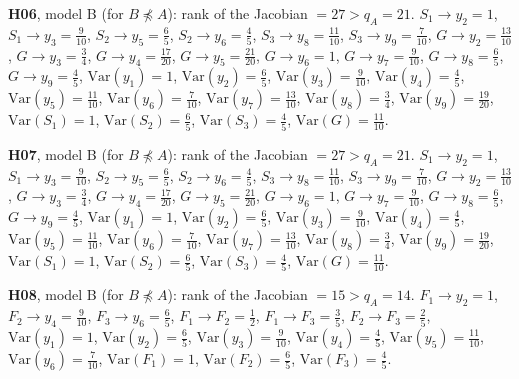 \documentclass[10pt,a4paper]{article}
\newcommand{\nnest}{\not\preceq}
\begin{document}
{\noindent\textbf{H06}, model B (for $B\nnest A$): rank of the Jacobian $=27>q_A=21$. {\footnotesize $S_{1}\to y_{2}=1$, $S_{1}\to y_{3}=\tfrac{9}{10}$, $S_{2}\to y_{5}=\tfrac{6}{5}$, $S_{2}\to y_{6}=\tfrac{4}{5}$, $S_{3}\to y_{8}=\tfrac{11}{10}$, $S_{3}\to y_{9}=\tfrac{7}{10}$, $G\to y_{2}=\tfrac{13}{10}$, $G\to y_{3}=\tfrac{3}{4}$, $G\to y_{4}=\tfrac{17}{20}$, $G\to y_{5}=\tfrac{21}{20}$, $G\to y_{6}=1$, $G\to y_{7}=\tfrac{9}{10}$, $G\to y_{8}=\tfrac{6}{5}$, $G\to y_{9}=\tfrac{4}{5}$, $\mathrm{Var}(y_{1})=1$, $\mathrm{Var}(y_{2})=\tfrac{6}{5}$, $\mathrm{Var}(y_{3})=\tfrac{9}{10}$, $\mathrm{Var}(y_{4})=\tfrac{4}{5}$, $\mathrm{Var}(y_{5})=\tfrac{11}{10}$, $\mathrm{Var}(y_{6})=\tfrac{7}{10}$, $\mathrm{Var}(y_{7})=\tfrac{13}{10}$, $\mathrm{Var}(y_{8})=\tfrac{3}{4}$, $\mathrm{Var}(y_{9})=\tfrac{19}{20}$, $\mathrm{Var}(S_{1})=1$, $\mathrm{Var}(S_{2})=\tfrac{6}{5}$, $\mathrm{Var}(S_{3})=\tfrac{4}{5}$, $\mathrm{Var}(G)=\tfrac{11}{10}$.}\par\smallskip
\noindent\textbf{H07}, model B (for $B\nnest A$): rank of the Jacobian $=27>q_A=21$. {\footnotesize $S_{1}\to y_{2}=1$, $S_{1}\to y_{3}=\tfrac{9}{10}$, $S_{2}\to y_{5}=\tfrac{6}{5}$, $S_{2}\to y_{6}=\tfrac{4}{5}$, $S_{3}\to y_{8}=\tfrac{11}{10}$, $S_{3}\to y_{9}=\tfrac{7}{10}$, $G\to y_{2}=\tfrac{13}{10}$, $G\to y_{3}=\tfrac{3}{4}$, $G\to y_{4}=\tfrac{17}{20}$, $G\to y_{5}=\tfrac{21}{20}$, $G\to y_{6}=1$, $G\to y_{7}=\tfrac{9}{10}$, $G\to y_{8}=\tfrac{6}{5}$, $G\to y_{9}=\tfrac{4}{5}$, $\mathrm{Var}(y_{1})=1$, $\mathrm{Var}(y_{2})=\tfrac{6}{5}$, $\mathrm{Var}(y_{3})=\tfrac{9}{10}$, $\mathrm{Var}(y_{4})=\tfrac{4}{5}$, $\mathrm{Var}(y_{5})=\tfrac{11}{10}$, $\mathrm{Var}(y_{6})=\tfrac{7}{10}$, $\mathrm{Var}(y_{7})=\tfrac{13}{10}$, $\mathrm{Var}(y_{8})=\tfrac{3}{4}$, $\mathrm{Var}(y_{9})=\tfrac{19}{20}$, $\mathrm{Var}(S_{1})=1$, $\mathrm{Var}(S_{2})=\tfrac{6}{5}$, $\mathrm{Var}(S_{3})=\tfrac{4}{5}$, $\mathrm{Var}(G)=\tfrac{11}{10}$.}\par\smallskip
\noindent\textbf{H08}, model B (for $B\nnest A$): rank of the Jacobian $=15>q_A=14$. {\footnotesize $F_{1}\to y_{2}=1$, $F_{2}\to y_{4}=\tfrac{9}{10}$, $F_{3}\to y_{6}=\tfrac{6}{5}$, $F_{1}\to F_{2}=\tfrac{1}{2}$, $F_{1}\to F_{3}=\tfrac{3}{5}$, $F_{2}\to F_{3}=\tfrac{2}{5}$, $\mathrm{Var}(y_{1})=1$, $\mathrm{Var}(y_{2})=\tfrac{6}{5}$, $\mathrm{Var}(y_{3})=\tfrac{9}{10}$, $\mathrm{Var}(y_{4})=\tfrac{4}{5}$, $\mathrm{Var}(y_{5})=\tfrac{11}{10}$, $\mathrm{Var}(y_{6})=\tfrac{7}{10}$, $\mathrm{Var}(F_{1})=1$, $\mathrm{Var}(F_{2})=\tfrac{6}{5}$, $\mathrm{Var}(F_{3})=\tfrac{4}{5}$.}\par\smallskip
}
\end{document}
